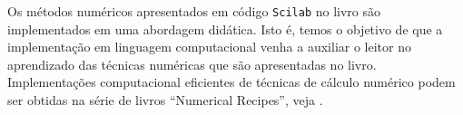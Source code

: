 Os métodos numéricos apresentados em código \verb+Scilab+ no livro são implementados em uma abordagem didática. Isto é, temos o objetivo de que a implementação em linguagem computacional venha a auxiliar o leitor no aprendizado das técnicas numéricas que são apresentadas no livro. Implementações computacional eficientes de técnicas de cálculo numérico podem ser obtidas na série de livros ``Numerical Recipes'', veja \cite{numerical}.
\fi

